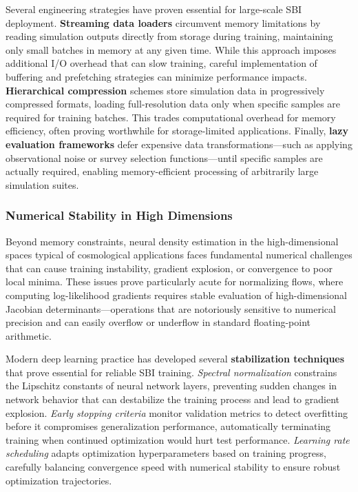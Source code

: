\documentclass{SciPost}
\begin{document}
Several engineering strategies have proven essential for large-scale SBI deployment. \textbf{Streaming data loaders} circumvent memory limitations by reading simulation outputs directly from storage during training, maintaining only small batches in memory at any given time. While this approach imposes additional I/O overhead that can slow training, careful implementation of buffering and prefetching strategies can minimize performance impacts. \textbf{Hierarchical compression} schemes store simulation data in progressively compressed formats, loading full-resolution data only when specific samples are required for training batches. This trades computational overhead for memory efficiency, often proving worthwhile for storage-limited applications. Finally, \textbf{lazy evaluation frameworks} defer expensive data transformations—such as applying observational noise or survey selection functions—until specific samples are actually required, enabling memory-efficient processing of arbitrarily large simulation suites.

\subsubsection{Numerical Stability in High Dimensions}

Beyond memory constraints, neural density estimation in the high-dimensional spaces typical of cosmological applications faces fundamental numerical challenges that can cause training instability, gradient explosion, or convergence to poor local minima. These issues prove particularly acute for normalizing flows, where computing log-likelihood gradients requires stable evaluation of high-dimensional Jacobian determinants—operations that are notoriously sensitive to numerical precision and can easily overflow or underflow in standard floating-point arithmetic.

Modern deep learning practice has developed several \textbf{stabilization techniques} that prove essential for reliable SBI training. \textit{Spectral normalization} constrains the Lipschitz constants of neural network layers, preventing sudden changes in network behavior that can destabilize the training process and lead to gradient explosion. \textit{Early stopping criteria} monitor validation metrics to detect overfitting before it compromises generalization performance, automatically terminating training when continued optimization would hurt test performance. \textit{Learning rate scheduling} adapts optimization hyperparameters based on training progress, carefully balancing convergence speed with numerical stability to ensure robust optimization trajectories.
\end{document}
